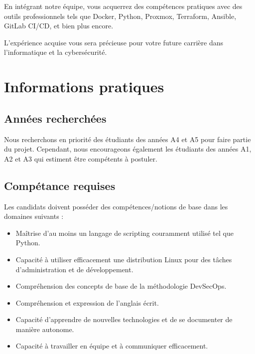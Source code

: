 \documentclass[12pt]{article}
\begin{document}
	\noindent En intégrant notre équipe, vous acquerrez des compétences pratiques avec des outils professionnels tels que Docker, Python, Proxmox, Terraform, Ansible, GitLab CI/CD, et bien plus encore.
	
	\bigskip
	
	\noindent L'expérience acquise vous sera précieuse pour votre future carrière dans l'informatique et la cybersécurité.
	
	
	
	\section{Informations pratiques}
	\subsection{Années recherchées}
	Nous recherchons en priorité des étudiants des années A4 et A5 pour faire partie du projet. Cependant, nous encourageons également les étudiants des années A1, A2 et A3 qui estiment être compétents à postuler.
	\subsection{Compétance requises}
	Les candidats doivent posséder des compétences/notions de base dans les domaines suivants :
	\begin{itemize}
		\setlength\itemsep{0pt}
		\item Maîtrise d'au moins un langage de scripting couramment utilisé tel que Python.
		\item Capacité à utiliser efficacement une distribution Linux pour des tâches d'administration et de développement.
		\item Compréhension des concepts de base de la méthodologie DevSecOps.
		\item Compréhension et expression de l'anglais écrit.
		\item Capacité d'apprendre de nouvelles technologies et de se documenter de manière autonome.
		\item Capacité à travailler en équipe et à communiquer efficacement.
		
	\end{itemize}
	
\end{document}
